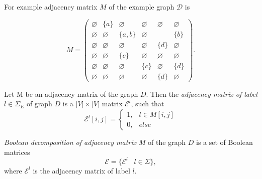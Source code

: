 For example adjacency matrix $M$ of the example graph $\mathcal{D}$ is

$$
    M =
    \begin{pmatrix}
    \varnothing     & \{a\} &   \varnothing      &   \varnothing   &   \varnothing   &   \varnothing   \\
    \varnothing     &   \varnothing   & \{a, b\} &   \varnothing   &       & \{b\} \\
    \varnothing     &   \varnothing   &   \varnothing      &   \varnothing   & \{d\} &   \varnothing   \\
    \varnothing     &   \varnothing   & \{c\}    &   \varnothing   &   \varnothing   &   \varnothing   \\
    \varnothing     &   \varnothing   &   \varnothing      & \{c\} &   \varnothing   & \{d\} \\
    \varnothing     & \varnothing     &   \varnothing      &   \varnothing   & \{d\} &   \varnothing
    \end{pmatrix}.
$$

\begin{definition}
Let M be an adjacency matrix of the graph $D$. Then the \emph{adjacency matrix of label} $l \in \Sigma_E$ of graph $D$ is a $|V| \times |V|$ matrix $\mathcal{E}^l$, such that
\begin{equation*}
\mathcal{E}^l[i,j] =
 \begin{cases}
   1, & l \in M[i,j]\\
   0, & else
 \end{cases}
\end{equation*}
\end{definition}

\begin{definition}
\emph{Boolean decomposition of adjacency matrix} $M$ of the graph $D$ is a set of Boolean matrices $$\mathcal{E} = \{\mathcal{E}^l \mid l \in \Sigma\},$$
where $\mathcal{E}^l$ is the adjacency matrix of label $l$.
\end{definition}

